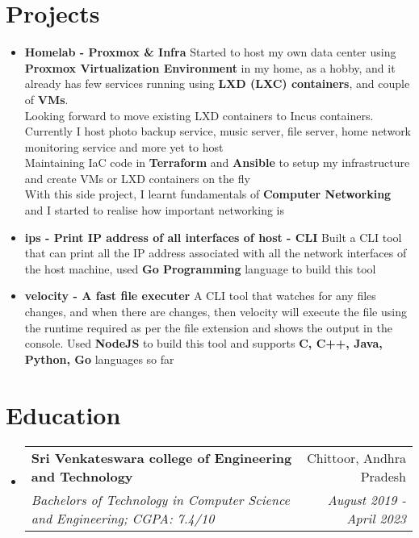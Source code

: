 \documentclass[letterpaper,11pt]{article}
\makeatletter
\newcommand{\resumeItem}[2]{
  \item\small{
    \textbf{#1}{ #2 \vspace{-2pt}}
  }
}
\newcommand{\resumeSubheading}[4]{
  \vspace{-1pt}\item
    \begin{tabular*}{0.97\textwidth}{l@{\extracolsep{\fill}}r}
      \textbf{#1} & #2 \\
      \textit{\small#3} & \textit{\small #4} \\
    \end{tabular*}\vspace{-5pt}
}
\newcommand{\resumeSubItem}[2]{\resumeItem{#1}{#2}\vspace{-4pt}}
\newcommand{\resumeSubHeadingListStart}{\begin{itemize}[leftmargin=*]}
\newcommand{\resumeSubHeadingListEnd}{\end{itemize}}
\makeatother
\begin{document}
\section{Projects}
  \resumeSubHeadingListStart
    \resumeSubItem{Homelab - Proxmox \& Infra}
      {Started to host my own data center using \textbf{Proxmox Virtualization Environment} in my home, as a hobby, and it already has few services running using \textbf{LXD (LXC) containers}, and couple of \textbf{VMs}. \\
      Looking forward to move existing LXD containers to Incus containers. Currently I host photo backup service, music server, file server, home network monitoring service and more yet to host\\
      Maintaining IaC code in \textbf{Terraform} and \textbf{Ansible} to setup my infrastructure and create VMs or LXD containers on the fly\\
      With this side project, I learnt fundamentals of \textbf{Computer Networking} and I started to realise how important networking is}
    \resumeSubItem{ips - Print IP address of all interfaces of host - CLI}
      {Built a CLI tool that can print all the IP address associated with all the network interfaces of the host machine, used \textbf{Go Programming} language to build this tool}
    \resumeSubItem{velocity - A fast file executer}
      {A CLI tool that watches for any files changes, and when there are changes, then velocity will execute the file using the runtime required as per the file extension and shows the output in the console. Used \textbf{NodeJS} to build this tool and supports \textbf{C, C++, Java, Python, Go} languages so far}
  \resumeSubHeadingListEnd

\section{Education}
  \resumeSubHeadingListStart
    \resumeSubheading
      {Sri Venkateswara college of Engineering and Technology}{Chittoor, Andhra Pradesh}
      {Bachelors of Technology in Computer Science and Engineering;  CGPA: 7.4/10}{August 2019 - April 2023}
  \resumeSubHeadingListEnd
\end{document}
